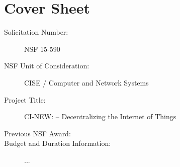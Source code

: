 
\section*{Cover Sheet}

\begin{description}
  \item[Solicitation Number:] NSF 15-590
  \item[NSF Unit of Consideration:] CISE / Computer and Network Systems
  \item[Project Title:] CI-NEW: \sysname -- Decentralizing the Internet of Things
  \item[Previous NSF Award:] 
  \item[Budget and Duration Information:] ...
\end{description}

\newpage


